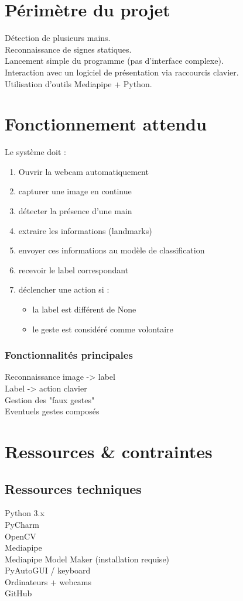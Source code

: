 \documentclass{article}
\begin{document}
\section{Périmètre du projet}
Détection de plusieurs mains. \\
Reconnaissance de signes statiques. \\
Lancement simple du programme (pas d'interface complexe). \\
Interaction avec un logiciel de présentation via raccourcis clavier. \\
Utilisation d'outils Mediapipe + Python. \\
\section{Fonctionnement attendu}
Le système doit : 
\begin{enumerate}[label=\roman*]
\item Ouvrir la webcam automatiquement
\item capturer une image en continue
\item détecter la présence d'une main
\item extraire les informations (landmarks)
\item envoyer ces informations au modèle de classification
\item recevoir le label correspondant
\item déclencher une action si :
\begin{itemize}
\item la label est différent de None
\item le geste est considéré comme volontaire
\end{itemize}
\end{enumerate}
\subsubsection*{Fonctionnalités principales}
Reconnaissance image -> label \\
Label -> action clavier \\
Gestion des "faux gestes" \\
Eventuels gestes composés
\section{Ressources \& contraintes}
\subsection*{Ressources techniques}
Python 3.x \\
PyCharm \\
OpenCV \\
Mediapipe \\
Mediapipe Model Maker (installation requise) \\
PyAutoGUI / keyboard \\
Ordinateurs + webcams\\
GitHub
\end{document}

